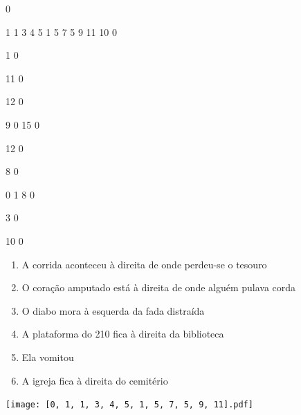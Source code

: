 \documentclass[12pt]{article}
\begin{document}
		\vfill  
		  
{
	0	%

	1	%
	1	%
	3	%
	4	%
	5	%
	1	%
	5	%
	7	%
	5	%
	9	%
	11	%
	10	%
	0	%

	1	%
	0	%

	11	%
	0	%

	12	%
	0	%

	9	%
	0	%
	15	%
	0	%

	12	%
	0	%

	8	%
	0	%

	0	%
	1	%
	8	%
	0	%

	3	%
	0	%

	10	%
	0	%

}	  
		    	

		 

\pagebreak


	\begin{enumerate}
		  \sffamily %
		  \large %


\vfill \item
A corrida aconteceu	%
à direita
de onde perdeu-se o tesouro	%

\vfill \item
O coração amputado está	%
à direita
de onde alguém pulava corda	%

\vfill \item
O diabo mora	%
à esquerda
da fada distraída	%

\vfill \item
A plataforma do 210 fica	%
à direita
da biblioteca	%

\vfill \item
Ela	%
vomitou	%

\vfill \item
A igreja fica	%
à direita
do cemitério	%
	\end{enumerate}
		  
		  \hfill

		  \vfill

\texttt{[image: [0, 1, 1, 3, 4, 5, 1, 5, 7, 5, 9, 11].pdf]}


	\hfill	  	  

\end{document}
